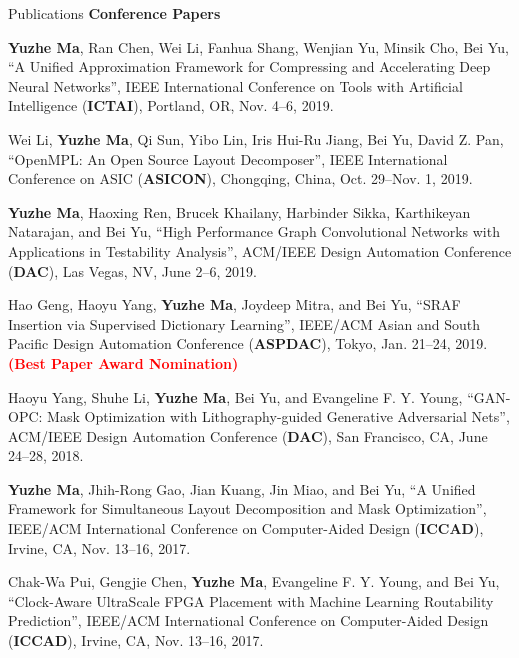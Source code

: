 \begin{rSection}{Publications}
\textbf{Conference Papers}
\begin{description}[font=\normalfont]

\item[{[C9]}]{
   \textbf{Yuzhe Ma}, Ran Chen, Wei Li, Fanhua Shang, Wenjian Yu, Minsik Cho, Bei Yu,
        ``A Unified Approximation Framework for Compressing and Accelerating Deep Neural Networks'', 
        IEEE International Conference on Tools with Artificial Intelligence (\textbf{ICTAI}), Portland, OR, Nov. 4--6, 2019.
}

\item[{[C8]}]{
        Wei Li, \textbf{Yuzhe Ma}, Qi Sun, Yibo Lin, Iris Hui-Ru Jiang, Bei Yu, David Z. Pan, 
        ``OpenMPL: An Open Source Layout Decomposer'', 
        IEEE International Conference on ASIC (\textbf{ASICON}), Chongqing, China, Oct. 29--Nov. 1, 2019.
}

\item[{[C7]}]{
	\textbf{Yuzhe Ma}, Haoxing Ren, Brucek Khailany, Harbinder Sikka, Karthikeyan Natarajan, and Bei Yu, 
     ``High Performance Graph Convolutional Networks with Applications in Testability Analysis'',
     ACM/IEEE Design Automation Conference (\textbf{DAC}), Las Vegas, NV, June 2--6, 2019.
}

\item[{[C6]}]{
	Hao Geng, Haoyu Yang, \textbf{Yuzhe Ma}, Joydeep Mitra, and Bei Yu, 
	``SRAF Insertion via Supervised Dictionary Learning'', 
	IEEE/ACM Asian and South Pacific Design Automation Conference (\textbf{ASPDAC}), Tokyo, Jan. 21--24, 2019. \textbf{\textcolor{red}{(Best Paper Award Nomination)}}
}

\item[{[C5]}]{
	Haoyu Yang, Shuhe Li, \textbf{Yuzhe Ma}, Bei Yu, and Evangeline F. Y. Young,
	``GAN-OPC: Mask Optimization with Lithography-guided Generative Adversarial Nets'', 
	ACM/IEEE Design Automation Conference (\textbf{DAC}), San Francisco, CA, June 24--28, 2018.
}

\item[{[C4]}]{
	\textbf{Yuzhe Ma}, Jhih-Rong Gao, Jian Kuang, Jin Miao, and Bei Yu,
	``A Unified Framework for Simultaneous Layout Decomposition and Mask Optimization'',
	IEEE/ACM International Conference on Computer-Aided Design (\textbf{ICCAD}), Irvine, CA, Nov. 13--16, 2017.
}

\item[{[C3]}]{
	Chak-Wa Pui, Gengjie Chen, \textbf{Yuzhe Ma}, Evangeline F. Y. Young, and Bei Yu,
	``Clock-Aware UltraScale FPGA Placement with Machine Learning Routability Prediction'', 
	IEEE/ACM International Conference on Computer-Aided Design (\textbf{ICCAD}), Irvine, CA, Nov. 13--16, 2017.
}


\end{description}
\end{rSection}

